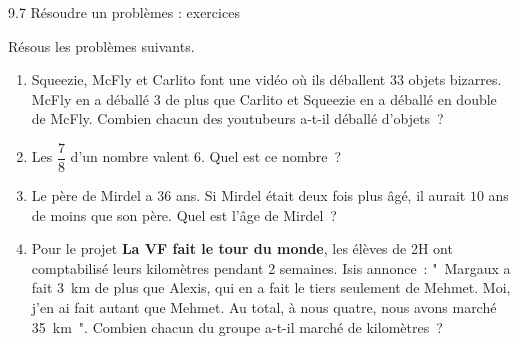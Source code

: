 \documentclass[parskip=half-, 12pt, DIV=15, twoside=semi]{scrbook}
\begin{document}
\begin{huge}
    9.7 Résoudre un problèmes : exercices
\end{huge}

\medbreak

\begin{exercise}
    Résous les problèmes suivants.
    \begin{enumerate}
        \item Squeezie, McFly et Carlito font une vidéo où ils déballent $33$
              objets bizarres. McFly en a déballé $3$ de plus que Carlito et
              Squeezie en a déballé en double de McFly. Combien chacun des
              youtubeurs a-t-il déballé d'objets~?
    
        \item Les $\dfrac{7}{8}$ d'un nombre valent $6$. Quel est ce nombre~?
    
        \item Le père de Mirdel a $36$ ans. Si Mirdel était deux fois plus âgé, il
              aurait $10$ ans de moins que son père. Quel est l'âge de Mirdel~?
    
        \item Pour le projet \textbf{La VF fait le tour du monde}, les élèves de
              2\ieme H ont comptabilisé leurs kilomètres pendant 2
              semaines. Isis annonce~: "~Margaux a fait \SI{3}{km} de plus que Alexis,
              qui en a fait le tiers seulement de Mehmet. Moi, j'en ai fait autant
              que Mehmet. Au total, à nous quatre, nous avons marché \SI{35}{km}~".
              Combien chacun du groupe a-t-il marché de kilomètres~?
    

\end{enumerate}
\end{exercise}
\end{document}
